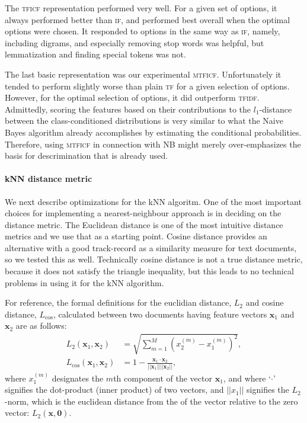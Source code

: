 \documentclass[conference,letterpaper]{IEEEtran}
\begin{document}
The \textsc{tficf} representation performed very well.  For a given set of 
options, it always performed better than \textsc{if}, and performed best 
overall when the optimal options were chosen.  It responded to options in the 
same
way as \textsc{if}, namely, including digrams, and especially removing stop
words was helpful, but lemmatization and finding special tokens was not.

The last basic representation was our experimental \textsc{mtficf}.  
Unfortunately it tended to perform slightly worse than plain \textsc{tf} for
a given selection of options.  However, for the optimal selection of options,
it did outperform \textsc{tfidf}.  Admittedly, scoring the 
features based on their contributions to the $l_1$-distance between the 
class-conditioned distributions is very similar to what the Naive Bayes 
algorithm already accomplishes by estimating the conditional probabilities.
Therefore, using \textsc{mtficf} in connection with NB might merely 
over-emphasizes the basis for descrimination that is already used.

\paragraph*{kNN distance metric}
We next describe optimizations for the kNN algoritm.  One of the most important
choices for implementing a nearest-neighbour approach is in deciding
on the distance metric.  The Euclidean distance is one of the most intuitive
distance metrics and we use that as a starting point.
Cosine distance provides an alternative with a good track-record as a 
similarity measure for text documents, so we tested this as well.  
Technically cosine distance is not
a true distance metric, because it does not satisfy the triangle inequality,
but this leads to no technical problems in using it for the kNN algorithm.

For reference, the formal definitions for the euclidian distance, $L_2$ and
cosine distance, $L_\mathrm{cos}$, calculated between two documents having 
feature vectors $\mathbf{x}_1$ and $\mathbf{x}_2$ are as follows:
\begin{align}
	L_2(\mathbf{x}_1, \mathbf{x}_2) 
		&= \sqrt{\sum_{m=1}^M (x_2^{(m)} - x_1^{(m)})^2}, \\
	L_\mathrm{cos}(\mathbf{x}_1, \mathbf{x}_2) 
		&= 1 - \frac{\mathbf{x}_1 \cdot \mathbf{x}_2}
			{||\mathbf{x}_1|| ||\mathbf{x}_2||},
\end{align}
where $x_1^{(m)}$ designates the $m$th component of the vector $\mathbf{x}_1$,
and where `$\cdot$' signifies the dot-product (inner product) of two vectors,
and $||x_1||$ signifies the $L_2$-norm, which is the euclidean distance from
the of the vector relative to the zero vector: $L_2(\mathbf{x}, \mathbf{0})$.
\end{document}
